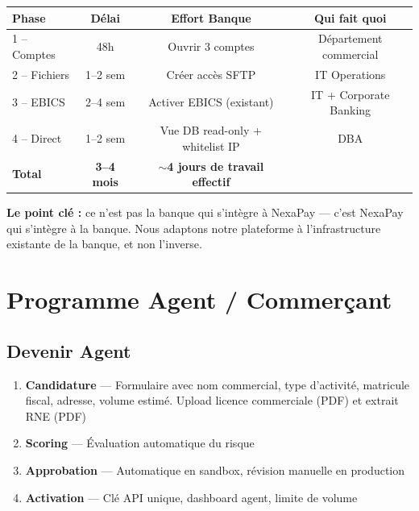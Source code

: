 \documentclass[11pt,a4paper]{article}
\begin{document}
\begin{center}
\begin{tabular}{|l|c|c|c|}
\hline
\textbf{Phase} & \textbf{D\'elai} & \textbf{Effort Banque} & \textbf{Qui fait quoi} \\
\hline
1 -- Comptes    & 48h      & Ouvrir 3 comptes                    & D\'epartement commercial \\
2 -- Fichiers   & 1--2 sem & Cr\'eer acc\`es SFTP               & IT Operations \\
3 -- EBICS      & 2--4 sem & Activer EBICS (existant)           & IT + Corporate Banking \\
4 -- Direct     & 1--2 sem & Vue DB read-only + whitelist IP    & DBA \\
\hline
\textbf{Total}  & \textbf{3--4 mois} & \textbf{$\sim$4 jours de travail effectif} & \\
\hline
\end{tabular}
\end{center}

\textbf{Le point cl\'e :} ce n'est pas la banque qui s'int\`egre \`a NexaPay --- c'est NexaPay qui s'int\`egre \`a la banque. Nous adaptons notre plateforme \`a l'infrastructure existante de la banque, et non l'inverse.

\newpage

\section{Programme Agent / Commer\c{c}ant}

\subsection{Devenir Agent}

\begin{enumerate}[leftmargin=*]
    \item \textbf{Candidature} --- Formulaire avec nom commercial, type d'activit\'e, matricule fiscal, adresse, volume estim\'e. Upload licence commerciale (PDF) et extrait RNE (PDF)
    \item \textbf{Scoring} --- \'Evaluation automatique du risque
    \item \textbf{Approbation} --- Automatique en sandbox, r\'evision manuelle en production
    \item \textbf{Activation} --- Cl\'e API unique, dashboard agent, limite de volume
\end{enumerate}
\end{document}
